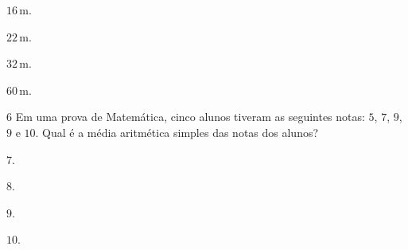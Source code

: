 \begin{multicols}{2}
\begin{escolha}
\item $16\,\text{m}$.
\item $22\,\text{m}$.
\item $32\,\text{m}$.
\item $60\,\text{m}$.
\end{escolha}
\end{multicols}



\num{6}  Em uma prova de Matemática, cinco alunos tiveram as seguintes notas:
$5$, $7$, $9$, $9$ e $10$. Qual é a média aritmética simples das notas dos alunos?

\begin{multicols}{2}
\begin{escolha}
\item $7$.
\item $8$.
\item $9$.
\item $10$.
\end{escolha}
\end{multicols}


